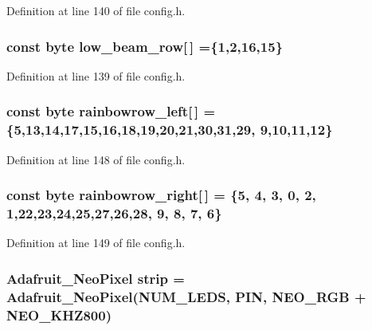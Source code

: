 Definition at line 140 of file config.\+h.

\subsubsection[{\texorpdfstring{low\+\_\+beam\+\_\+row}{low_beam_row}}]{\setlength{\rightskip}{0pt plus 5cm}const byte low\+\_\+beam\+\_\+row\mbox{[}$\,$\mbox{]} =\{1,2,16,15\}}\hypertarget{group__deployment_ga1a25903a2850d9849775664473070489}{}\label{group__deployment_ga1a25903a2850d9849775664473070489}


Definition at line 139 of file config.\+h.

\subsubsection[{\texorpdfstring{rainbowrow\+\_\+left}{rainbowrow_left}}]{\setlength{\rightskip}{0pt plus 5cm}const byte rainbowrow\+\_\+left\mbox{[}$\,$\mbox{]} = \{5,13,14,17,15,16,18,19,20,21,30,31,29, 9,10,11,12\}}\hypertarget{group__deployment_gad4e8497757364dbc8187298bd87acc44}{}\label{group__deployment_gad4e8497757364dbc8187298bd87acc44}


Definition at line 148 of file config.\+h.

\subsubsection[{\texorpdfstring{rainbowrow\+\_\+right}{rainbowrow_right}}]{\setlength{\rightskip}{0pt plus 5cm}const byte rainbowrow\+\_\+right\mbox{[}$\,$\mbox{]} = \{5, 4, 3, 0, 2, 1,22,23,24,25,27,26,28, 9, 8, 7, 6\}}\hypertarget{group__deployment_ga00c047fede9a8b6c020ba1d108d63cea}{}\label{group__deployment_ga00c047fede9a8b6c020ba1d108d63cea}


Definition at line 149 of file config.\+h.

\subsubsection[{\texorpdfstring{strip}{strip}}]{\setlength{\rightskip}{0pt plus 5cm}Adafruit\+\_\+\+Neo\+Pixel strip = Adafruit\+\_\+\+Neo\+Pixel({\bf N\+U\+M\+\_\+\+L\+E\+DS}, {\bf P\+IN}, N\+E\+O\+\_\+\+R\+GB + N\+E\+O\+\_\+\+K\+H\+Z800)}\hypertarget{group__deployment_gacf2771bd8bfaf855bbcc6c30301bf380}{}\label{group__deployment_gacf2771bd8bfaf855bbcc6c30301bf380}


